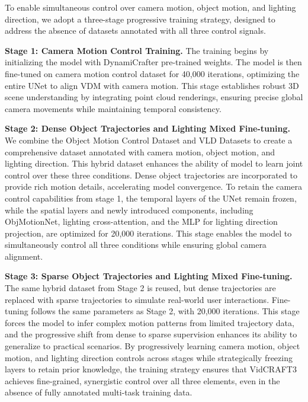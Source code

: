 To enable simultaneous control over camera motion, object motion, and lighting direction, we adopt a three-stage progressive training strategy, designed to address the absence of datasets annotated with all three control signals.

\noindent \textbf{Stage 1: Camera Motion Control Training.}
The training begins by initializing the model with DynamiCrafter pre-trained weights. The model is then fine-tuned on camera motion control dataset for 40,000 iterations, optimizing the entire UNet to align VDM with camera motion. This stage establishes robust 3D scene understanding by integrating point cloud renderings, ensuring precise global camera movements while maintaining temporal consistency.

\noindent \textbf{Stage 2: Dense Object Trajectories and Lighting Mixed Fine-tuning.}
We combine the Object Motion Control Dataset and VLD Datasets to create a comprehensive dataset annotated with camera motion, object motion, and lighting direction. This hybrid dataset enhances the ability of model to learn joint control over these three conditions. Dense object trajectories are incorporated to provide rich motion details, accelerating model convergence.
To retain the camera control capabilities from stage 1, the temporal layers of the UNet remain frozen, while the spatial layers and newly introduced components, including ObjMotionNet, lighting cross-attention, and the MLP for lighting direction projection, are optimized for 20,000 iterations. This stage enables the model to simultaneously control all three conditions while ensuring global camera alignment.

\noindent \textbf{Stage 3: Sparse Object Trajectories and Lighting Mixed Fine-tuning.}
The same hybrid dataset from Stage 2 is reused, but dense trajectories are replaced with sparse trajectories to simulate real-world user interactions. Fine-tuning follows the same parameters as Stage 2, with 20,000 iterations. This stage forces the model to infer complex motion patterns from limited trajectory data, and the progressive shift from dense to sparse supervision enhances its ability to generalize to practical scenarios. By progressively learning camera motion, object motion, and lighting direction controls across stages while strategically freezing layers to retain prior knowledge, the training strategy ensures that VidCRAFT3 achieves fine-grained, synergistic control over all three elements, even in the absence of fully annotated multi-task training data.













